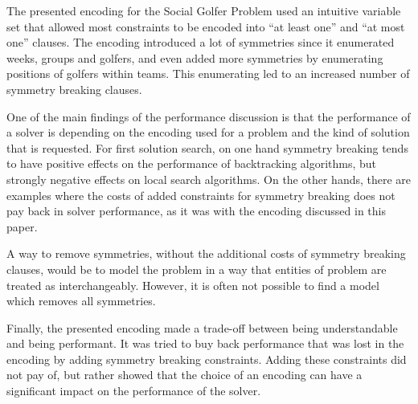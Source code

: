 \documentclass[a4paper]{scrartcl}
\begin{document}
The presented encoding for the Social Golfer Problem used an intuitive variable set that allowed most constraints to be encoded into ``at least one'' and ``at most one'' clauses. The encoding introduced a lot of symmetries since it enumerated weeks, groups and golfers, and even added more symmetries by enumerating positions of golfers within teams. This enumerating led to an increased number of symmetry breaking clauses.

One of the main findings of the performance discussion is that the performance of a solver is depending on the encoding used for a problem and the kind of solution that is requested. For first solution search, on one hand symmetry breaking tends to have positive effects on the performance of backtracking algorithms, but strongly negative effects on local search algorithms. On the other hands, there are examples where the costs of added constraints for symmetry breaking does not pay back in solver performance, as it was with the encoding discussed in this paper.

A way to remove symmetries, without the additional costs of symmetry breaking clauses, would be to model the problem in a way that entities of problem are treated as interchangeably. However, it is often not possible to find a model which removes all symmetries.

Finally, the presented encoding made a trade-off between being understandable and being performant. It was tried to buy back performance that was lost in the encoding by adding symmetry breaking constraints. Adding these constraints did not pay of, but rather showed that the choice of an encoding can have a significant impact on the performance of the solver.



\end{document}
